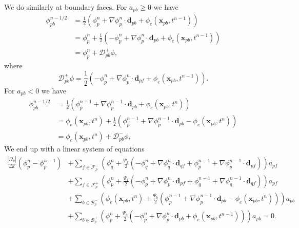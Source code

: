\documentclass[../thesis.tex]{subfiles}
\begin{document}
We do similarly at boundary faces. For \(a_{pb} \geq 0\) we have
\begin{align*}
	\phi_{pb}^{n-1/2}
	&= \frac{1}{2}
	\left(
		\phi_p^{n} + \nabla\phi_p^{n}\cdot\mathbf{d}_{pb} + \phi_e(\mathbf{x}_{pb}, t^{n-1})
	\right)\\
	&= \phi_p^{n} + \frac{1}{2}
	\left(
		-\phi_p^{n} + \nabla\phi_p^{n}\cdot\mathbf{d}_{pb} + \phi_e(\mathbf{x}_{pb}, t^{n-1})
	\right)\\
	&= \phi_p^{n} + \mathcal{D}^+_{pb}\phi,
\end{align*}
where \[
	\mathcal{D}^+_{pb}\phi =
	\frac{1}{2}\left(
		-\phi_p^n + \nabla\phi_p^n\cdot\mathbf{d}_{pf} + \phi_e(\mathbf{x}_{pb}, t^{n-1})
		\right).
	\]
For \(a_{pb} < 0\) we have
\begin{align*}
	\phi_{pb}^{n-1/2}
	&= \frac{1}{2}
	\left(
		\phi_p^{n-1} + \nabla\phi_p^{n-1}\cdot\mathbf{d}_{pb} + \phi_e(\mathbf{x}_{pb}, t^{n})
	\right)\\
	&= \phi_e(\mathbf{x}_{pb}, t^{n}) + \frac{1}{2}
	\left(
		\phi_p^{n-1} + \nabla\phi_p^{n-1}\cdot\mathbf{d}_{pb} - \phi_e(\mathbf{x}_{pb}, t^{n})
	\right)\\
	&= \phi_e(\mathbf{x}_{pb}, t^{n}) + \mathcal{D}^-_{pb}\phi,
\end{align*}
We end up with a linear system of equations
\begin{equation}
	\begin{split}
		\frac{|\Omega_p|}{\Delta t}(\phi_p^{n} - \phi_p^{n-1})
	&+ \sum_{f \in \mathcal{F}_p^-}
	\left(
		\phi_q^n + \frac{\Psi_f}{2}
		\left(
			-\phi_q^n + \nabla\phi_q^n\cdot\mathbf{d}_{qf} +
			\phi_p^{n-1} + \nabla\phi_p^{n-1}\cdot\mathbf{d}_{pf}
		\right)
	\right) a_{pf}\\
	&+ \sum_{f \in \mathcal{F}_p^+}
	\left(
		\phi_p^n + \frac{\Psi_f}{2}
		\left(
			-\phi_p^n + \nabla\phi_p^n\cdot\mathbf{d}_{pf} +
			\phi_q^{n-1} + \nabla\phi_q^{n-1}\cdot\mathbf{d}_{qf}
		\right)
	\right) a_{pf}\\
	&+ \sum_{b \in \mathcal{B}_p^-}
	\left(
		\phi_e(\mathbf{x}_{pb}, t^{n}) + \frac{\Psi_b}{2}
		\left(
			\phi_p^{n-1} + \nabla\phi_p^{n-1}\cdot\mathbf{d}_{pb}
			- \phi_e(\mathbf{x}_{pb}, t^{n})
		\right)
	\right) a_{pb}\\
	&+ \sum_{b \in \mathcal{B}_p^+}
	\left(
		\phi_p^{n} + \frac{\Psi_b}{2}
		\left(
			-\phi_p^{n} + \nabla\phi_p^{n}\cdot\mathbf{d}_{pb}
			+ \phi_e(\mathbf{x}_{pb}, t^{n-1})
		\right)
	\right) a_{pb} = 0.
	\end{split}
\end{equation}
\end{document}
